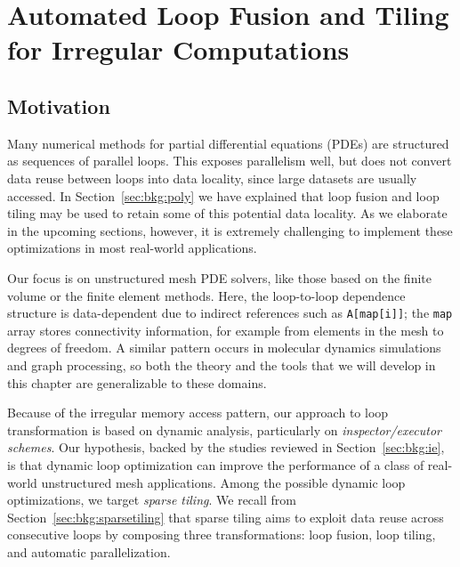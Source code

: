 \chapter{Automated Loop Fusion and Tiling for Irregular Computations}
\label{ch:sparsetiling}

\section{Motivation}
\label{sec:tiling:motivation}





Many numerical methods for partial differential equations (PDEs) are structured as sequences of parallel loops. This exposes parallelism well, but does not convert data reuse between loops into data locality, since large datasets are usually accessed. In Section~\ref{sec:bkg:poly} we have explained that loop fusion and loop tiling may be used to retain some of this potential data locality. As we elaborate in the upcoming sections, however, it is extremely challenging to implement these optimizations in most real-world applications. 

Our focus is on unstructured mesh PDE solvers, like those based on the finite volume or the finite element methods. Here, the  loop-to-loop dependence structure is data-dependent due to
indirect references such as \texttt{A[map[i]]}; the \texttt{map} array stores connectivity information, for example from elements in the mesh to degrees of freedom. A similar pattern occurs in molecular dynamics simulations and graph processing, so both the theory and the tools that we will develop in this chapter are generalizable to these domains. 

Because of the irregular memory access pattern, our approach to loop transformation is based on dynamic analysis, particularly on \textit{inspector/executor schemes}. Our hypothesis, backed by the studies reviewed in Section~\ref{sec:bkg:ie}, is that dynamic loop optimization can improve the performance of a class of real-world unstructured mesh applications. Among the possible dynamic loop optimizations, we target \textit{sparse tiling}. We recall from Section~\ref{sec:bkg:sparsetiling} that sparse tiling aims to exploit data reuse across consecutive loops by composing three transformations: loop fusion, loop tiling, and automatic parallelization. 

